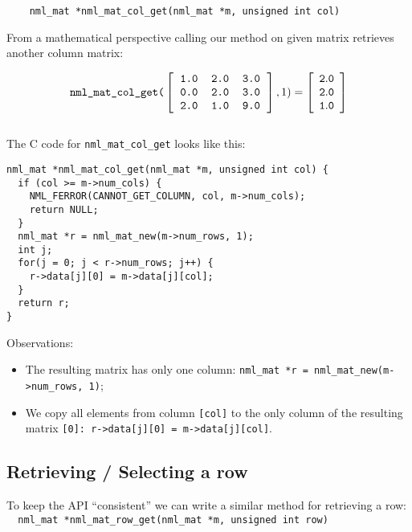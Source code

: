 \begin{verbatim}
    nml_mat *nml_mat_col_get(nml_mat *m, unsigned int col)
\end{verbatim}

From a mathematical perspective calling our method on given matrix retrieves another column matrix:

$$
\texttt{nml\_mat\_col\_get(}
\left[ \begin{tabular}{rrr}
\tt 1.0 & \tt 2.0 & \tt 3.0 \\
\tt 0.0 & \tt 2.0 & \tt 3.0 \\
\tt 2.0 & \tt 1.0 & \tt 9.0
\end{tabular} \right]
,1) =
\left[ \begin{array}{rrr}
\tt 2.0 \\
\tt 2.0 \\
\tt 1.0
\end{array} \right]
$$
\\
The C code for {\tt nml\_mat\_col\_get} looks like this:

\begin{verbatim}
nml_mat *nml_mat_col_get(nml_mat *m, unsigned int col) {
  if (col >= m->num_cols) {
    NML_FERROR(CANNOT_GET_COLUMN, col, m->num_cols);
    return NULL;
  }
  nml_mat *r = nml_mat_new(m->num_rows, 1);
  int j;
  for(j = 0; j < r->num_rows; j++) {
    r->data[j][0] = m->data[j][col];
  }
  return r;
} 
\end{verbatim}

Observations:
\\

\begin{itemize}
\item The resulting matrix has only one column: {\tt nml\_mat *r = nml\_mat\_new(m->num\_rows, 1)};
\item We copy all elements from column {\tt [col]} to the only column of the resulting matrix {\tt [0]: r->data[j][0] = m->data[j][col]}.
\end{itemize}

\subsection{Retrieving / Selecting a row}

To keep the API “consistent” we can write a similar method for retrieving a row:
\\

\texttt{ \ nml\_mat *nml\_mat\_row\_get(nml\_mat *m, unsigned int row)}
\\

